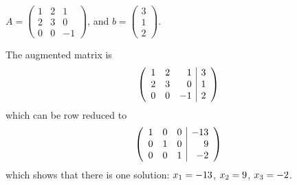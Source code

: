 \documentclass{ximera}
\begin{document}
\begin{exercise} 
$A = \begin{pmatrix}1 & 2 & 1\\ 2 & 3 & 0 \\ 0 & 0 & -1\end{pmatrix}$, 
and $b = \begin{pmatrix}3 \\ 1 \\ 2\end{pmatrix}$.  

\begin{multipleChoice}
\end{multipleChoice}

\begin{problem}
\soln
The augmented matrix is 
\[
\left(\begin{array}{rrr|r} 
  1 & 2 & 1 & {3} \\ 
  2 & 3 & 0 & {1} \\
  0 & 0 & -1 & {2} \end{array} \right)
  \]
which can be row reduced to
\[
\left(\begin{array}{rrr|r} 
  1 & 0 & 0 & {-13} \\ 
  0 & 1 & 0 & {9} \\
  0 & 0 & 1 & {-2} \end{array} \right)
  \]
which shows that there is one solution: $x_1={-13}$, $x_2={9}$, $x_3={-2}$. 

\end{problem}

\end{exercise}
\end{document}
